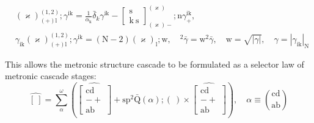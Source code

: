 \documentclass[12pt]{article}
\begin{document}
\begin{itemize}
\begin{equation}
\begin{aligned}
    & (\varkappa)^{(1,2)}_{(+)\mathrm{l}} ; \gamma^{\mathrm{ik}} = \frac{1}{\alpha_\mathrm{k}} \bar{\delta}_k \gamma^{\mathrm{ik}} - \left[ \begin{matrix} \mathrm{s} \\ \mathrm{k\ s} \end{matrix} \right]^{(\varkappa)}_{(\varkappa)-} ; \mathrm{n} \gamma^{\mathrm{ik}}_+, \\
    & \gamma_{\mathrm{ik}} (\varkappa)^{(1,2)}_{(+)\mathrm{l}} ; \gamma^{\mathrm{ik}} = (\mathrm{N}-2) (\varkappa)_\mathrm{l} ; \mathrm{w}, \quad {}^2\bar{\gamma} = \mathrm{w}^2 \bar{\gamma}, \quad \mathrm{w} = \sqrt{|\gamma|}, \quad \gamma = |\gamma_{\mathrm{ik}}|_\mathrm{N}
    \end{aligned} \tag{97a}
    \label{eq:original_sieb_trace_theorems}
    \end{equation}

    This allows the metronic structure cascade to be formulated as a selector law of metronic cascade stages:
    \begin{equation}
    \widehat{[\ ]} = \sum_\alpha^\omega \left( \widehat{ \left[ \begin{matrix} \mathrm{cd} \\ - + \\ \mathrm{ab} \end{matrix} \right] } + \mathrm{sp} {}^2\bar{\mathrm{Q}}(\alpha) ; (\ ) \times \widehat{ \left[ \begin{matrix} \mathrm{cd} \\ - + \\ \mathrm{ab} \end{matrix} \right] } \right), \quad \alpha \equiv \binom{\mathrm{cd}}{\mathrm{ab}} \tag{98}
    \end{equation}


\end{itemize}
\end{document}
